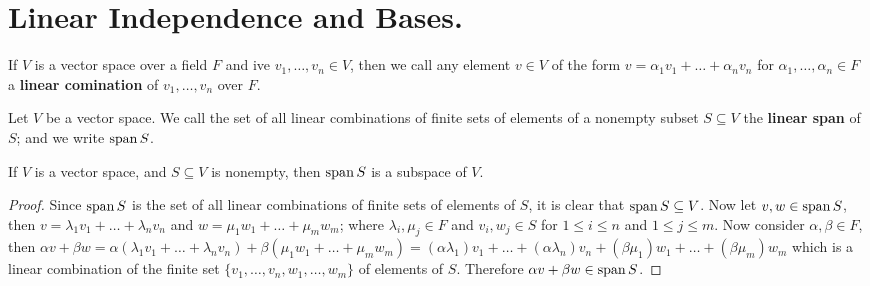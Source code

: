 
\section{Linear Independence and Bases.}
\label{section1}

\begin{definition}
     If $V$ is a vector space over a field  $F$ and ive  $ v_1, \dots,v_n \in
     V$, then we call any element $v \in V$ of the form $v=\alpha_1v_1+\dots+\alpha_n 
     v_n$ for $\alpha_1, \dots, \alpha_n \in F$ a \textbf{linear comination} 
     of $ v_1, \dots, v_n$ over $F$.
 \end{definition}

 \begin{definition}
     Let $V$ be a vector space. We call the set of all linear combinations of
     finite sets of elements of a nonempty subset  $S \subseteq V$ the
     \textbf{linear span} of $S$; and we write $\operatorname{span}{S}$.
 \end{definition}

 \begin{lemma}\label{1.2.1}
     If $V$ is a vector space, and  $S \subseteq V$ is nonempty, then
     $\operatorname{span}{S}$ is a subspace of $V$.
 \end{lemma}
 \begin{proof}
     Since $\operatorname{span}{S}$ is the set of all linear combinations of finite sets of
     elements of $S$, it is clear that  $\operatorname{span}{S} \subseteq V$. Now let $v,w \in
     \operatorname{span}{S}$, then $v=\lambda_1v_1+ \dots+\lambda_nv_n$ and
     $w=\mu_1w_1+\dots+\mu_mw_m$; where $\lambda_i,\mu_j \in F$ and  $v_i,w_j
     \in S$ for  $1 \leq i \leq n$ and  $1 \leq j \leq m$. Now consider
     $\alpha,\beta \in F$, then  $\alpha v+\beta w=\alpha(\lambda_1v_1+
     \dots+\lambda_nv_n)+\beta(\mu_1w_1+\dots+\mu_mw_m)=(\alpha\lambda_1)v_1+\dots+(\alpha\lambda_n)v_n+(\beta\mu_1)w_1+\dots+(\beta\mu_m)w_m$
     which is a linear combination of the finite set $\{v_1, \dots, v_n, w_1,
     \dots, w_m\}$ of elements of $S$. Therefore  $\alpha v+\beta w \in
     \operatorname{span}{S}$.
 \end{proof}

